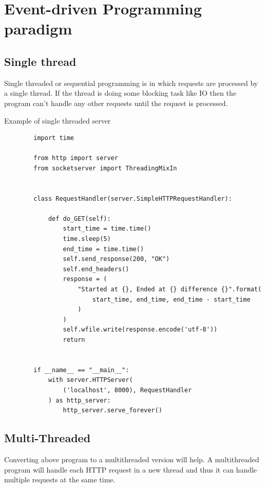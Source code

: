 \documentclass{article}
\begin{document}
  \section{Event-driven Programming paradigm}
    \subsection{Single thread}
      Single threaded or sequential programming is in which requests are
      processed by a single thread. If the thread is doing some blocking task
      like IO then the program can't handle any other requests until the
      request is processed.

      Example of single threaded server
      \begin{verbatim}
        import time

        from http import server
        from socketserver import ThreadingMixIn


        class RequestHandler(server.SimpleHTTPRequestHandler):

            def do_GET(self):
                start_time = time.time()
                time.sleep(5)
                end_time = time.time()
                self.send_response(200, "OK")
                self.end_headers()
                response = (
                    "Started at {}, Ended at {} difference {}".format(
                        start_time, end_time, end_time - start_time
                    )
                )
                self.wfile.write(response.encode('utf-8'))
                return


        if __name__ == "__main__":
            with server.HTTPServer(
                ('localhost', 8000), RequestHandler
            ) as http_server:
                http_server.serve_forever()
      \end{verbatim}

    \subsection{Multi-Threaded}
      Converting above program to a multithreaded version will help. A
      multithreaded program will handle each HTTP request in a new thread and
      thus it can handle multiple requests at the same time.
\end{document}
